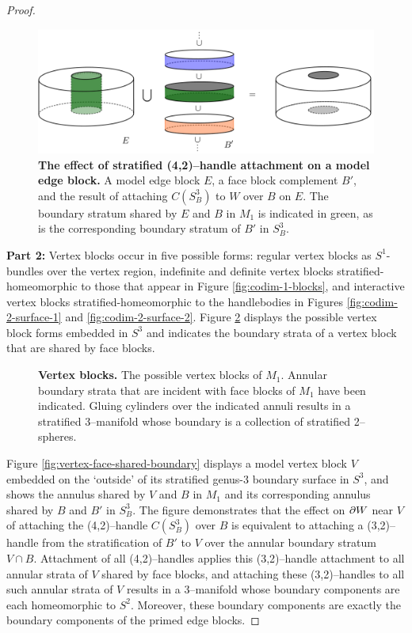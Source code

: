 \begin{proof}
	\begin{figure}[h!]
		\centering
		\includegraphics[width=\textwidth]{figures/edge-face-shared-boundary.png}
		\caption{
			\textbf{The effect of stratified (4,2)--handle attachment on a model edge block.}
			A model edge block $E$, a face block complement $B'$, and the result of attaching $C(S_B^3)$ to $W$ over $B$ on $E$.
			The boundary stratum shared by $E$ and $B$ in $M_1$ is indicated in green, as is the corresponding boundary stratum of $B'$ in $S_B^3$.
		}
		\label{fig:edge-face-shared-boundary}
	\end{figure}
	
	\textbf{Part 2:}	
	Vertex blocks occur in five possible forms: regular vertex blocks as $S^1$-bundles over the vertex region, indefinite and definite vertex blocks stratified-homeomorphic to those that appear in Figure \ref{fig:codim-1-blocks}, and interactive vertex blocks stratified-homeomorphic to the handlebodies in Figures \ref{fig:codim-2-surface-1} and \ref{fig:codim-2-surface-2}.
	Figure \ref{fig:vertex-block-incidence} displays the possible vertex block forms embedded in $S^3$ and indicates the boundary strata of a vertex block that are shared by face blocks.
	
	\begin{figure}[h!]
		\caption{
			\textbf{Vertex blocks.}
			The possible vertex blocks of $M_1$.
			Annular boundary strata that are incident with face blocks of $M_1$ have been indicated.
			Gluing cylinders over the indicated annuli results in a stratified 3--manifold whose boundary is a collection of stratified 2--spheres.
		}
		\label{fig:vertex-block-incidence}
	\end{figure}	
	
	Figure \ref{fig:vertex-face-shared-boundary} displays a model vertex block $V$ embedded on the `outside' of its stratified genus-3 boundary surface in $S^3$, and shows the annulus shared by $V$ and $B$ in $M_1$ and its corresponding annulus shared by $B$ and $B'$ in $S_B^3$.
	The figure demonstrates that the effect on $\partial W$ near $V$ of attaching the (4,2)--handle $C(S_B^3)$ over $B$ is equivalent to attaching a (3,2)--handle from the stratification of $B'$  to $V$ over the annular boundary stratum $V\cap B$.
	Attachment of all (4,2)--handles applies this (3,2)--handle attachment to all annular strata of $V$ shared by face blocks, and attaching these (3,2)--handles to all such annular strata of $V$ results in a 3--manifold whose boundary components are each homeomorphic to $S^2$.
	Moreover, these boundary components are exactly the boundary components of the primed edge blocks.
	

\end{proof}
